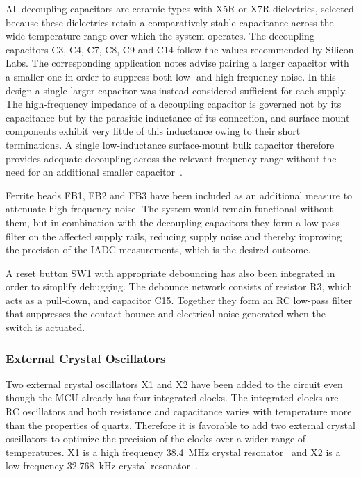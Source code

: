 All decoupling capacitors are ceramic types with X5R or X7R dielectrics, selected because these dielectrics retain a comparatively stable capacitance across the wide temperature range over which the system operates.
The decoupling capacitors C3, C4, C7, C8, C9 and C14 follow the values recommended by Silicon Labs. The corresponding application notes advise pairing a larger capacitor with a smaller one in order to suppress both low- and high-frequency noise. In this design a single larger capacitor was instead considered sufficient for each supply. The high-frequency impedance of a decoupling capacitor is governed not by its capacitance but by the parasitic inductance of its connection, and surface-mount components exhibit very little of this inductance owing to their short terminations. A single low-inductance surface-mount bulk capacitor therefore provides adequate decoupling across the relevant frequency range without the need for an additional smaller capacitor~\cite{ti_decoupling_capacitors_notes, bogatin_unlearn_pcb}.

Ferrite beads FB1, FB2 and FB3 have been included as an additional measure to attenuate high-frequency noise. The system would remain functional without them, but in combination with the decoupling capacitors they form a low-pass filter on the affected supply rails, reducing supply noise and thereby improving the precision of the IADC measurements, which is the desired outcome.
 
A reset button SW1 with appropriate debouncing has also been integrated in order to simplify debugging. The debounce network consists of resistor R3, which acts as a pull-down, and capacitor C15. Together they form an RC low-pass filter that suppresses the contact bounce and electrical noise generated when the switch is actuated.

\subsubsection{External Crystal Oscillators}
Two external crystal oscillators X1 and X2 have been added to the circuit even though the MCU already has four integrated clocks. The integrated clocks are RC oscillators and both resistance and capacitance varies with temperature more than the properties of quartz. Therefore it is favorable to add two external crystal oscillators to optimize the precision of the clocks over a wider range of temperatures. X1 is a high frequency \SI{38.4}{\mega\hertz} crystal resonator~\cite{X1_crystal} and X2 is a low frequency \SI{32.768}{\kilo\hertz} crystal resonator~\cite{X2_crystal}.

